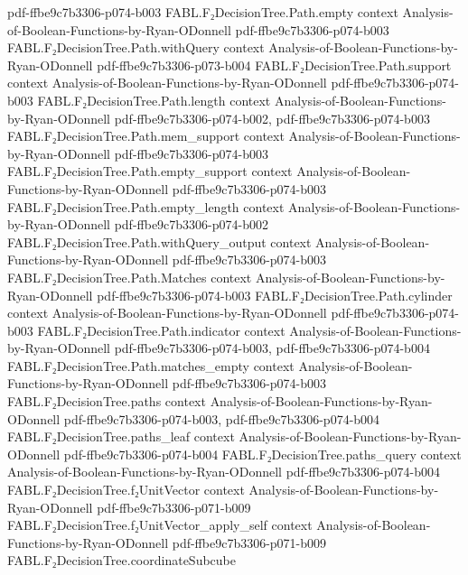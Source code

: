 \begin{theorem}
  {pdf-ffbe9c7b3306-p074-b003}
\proofstep
  {FABL.F₂DecisionTree.Path.empty}
  {context}
  {Analysis-of-Boolean-Functions-by-Ryan-ODonnell}
  {pdf-ffbe9c7b3306-p074-b003}
\proofstep
  {FABL.F₂DecisionTree.Path.withQuery}
  {context}
  {Analysis-of-Boolean-Functions-by-Ryan-ODonnell}
  {pdf-ffbe9c7b3306-p073-b004}
\proofstep
  {FABL.F₂DecisionTree.Path.support}
  {context}
  {Analysis-of-Boolean-Functions-by-Ryan-ODonnell}
  {pdf-ffbe9c7b3306-p074-b003}
\proofstep
  {FABL.F₂DecisionTree.Path.length}
  {context}
  {Analysis-of-Boolean-Functions-by-Ryan-ODonnell}
  {pdf-ffbe9c7b3306-p074-b002,
    pdf-ffbe9c7b3306-p074-b003}
\proofstep
  {FABL.F₂DecisionTree.Path.mem_support}
  {context}
  {Analysis-of-Boolean-Functions-by-Ryan-ODonnell}
  {pdf-ffbe9c7b3306-p074-b003}
\proofstep
  {FABL.F₂DecisionTree.Path.empty_support}
  {context}
  {Analysis-of-Boolean-Functions-by-Ryan-ODonnell}
  {pdf-ffbe9c7b3306-p074-b003}
\proofstep
  {FABL.F₂DecisionTree.Path.empty_length}
  {context}
  {Analysis-of-Boolean-Functions-by-Ryan-ODonnell}
  {pdf-ffbe9c7b3306-p074-b002}
\proofstep
  {FABL.F₂DecisionTree.Path.withQuery_output}
  {context}
  {Analysis-of-Boolean-Functions-by-Ryan-ODonnell}
  {pdf-ffbe9c7b3306-p074-b003}
\proofstep
  {FABL.F₂DecisionTree.Path.Matches}
  {context}
  {Analysis-of-Boolean-Functions-by-Ryan-ODonnell}
  {pdf-ffbe9c7b3306-p074-b003}
\proofstep
  {FABL.F₂DecisionTree.Path.cylinder}
  {context}
  {Analysis-of-Boolean-Functions-by-Ryan-ODonnell}
  {pdf-ffbe9c7b3306-p074-b003}
\proofstep
  {FABL.F₂DecisionTree.Path.indicator}
  {context}
  {Analysis-of-Boolean-Functions-by-Ryan-ODonnell}
  {pdf-ffbe9c7b3306-p074-b003,
    pdf-ffbe9c7b3306-p074-b004}
\proofstep
  {FABL.F₂DecisionTree.Path.matches_empty}
  {context}
  {Analysis-of-Boolean-Functions-by-Ryan-ODonnell}
  {pdf-ffbe9c7b3306-p074-b003}
\proofstep
  {FABL.F₂DecisionTree.paths}
  {context}
  {Analysis-of-Boolean-Functions-by-Ryan-ODonnell}
  {pdf-ffbe9c7b3306-p074-b003,
    pdf-ffbe9c7b3306-p074-b004}
\proofstep
  {FABL.F₂DecisionTree.paths_leaf}
  {context}
  {Analysis-of-Boolean-Functions-by-Ryan-ODonnell}
  {pdf-ffbe9c7b3306-p074-b004}
\proofstep
  {FABL.F₂DecisionTree.paths_query}
  {context}
  {Analysis-of-Boolean-Functions-by-Ryan-ODonnell}
  {pdf-ffbe9c7b3306-p074-b004}
\proofstep
  {FABL.F₂DecisionTree.f₂UnitVector}
  {context}
  {Analysis-of-Boolean-Functions-by-Ryan-ODonnell}
  {pdf-ffbe9c7b3306-p071-b009}
\proofstep
  {FABL.F₂DecisionTree.f₂UnitVector_apply_self}
  {context}
  {Analysis-of-Boolean-Functions-by-Ryan-ODonnell}
  {pdf-ffbe9c7b3306-p071-b009}
\proofstep
  {FABL.F₂DecisionTree.coordinateSubcube}

\end{theorem}
